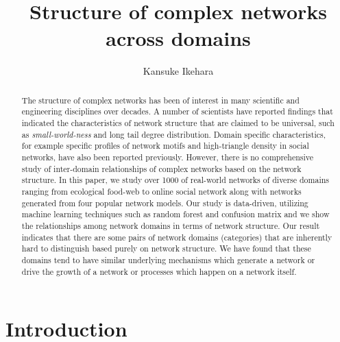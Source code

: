 \documentclass{article}
\begin{document}
\title{Structure of complex networks across domains}
\author{Kansuke Ikehara}
\maketitle

\begin{abstract}
The structure of complex networks has been of interest in many scientific and engineering disciplines over decades. A number of scientists have reported findings that indicated the characteristics of network structure that are claimed to be universal, such as \textit{small-world-ness} and long tail degree distribution. Domain specific characteristics, for example specific profiles of network motifs and high-triangle density in social networks, have also been reported previously. However, there is no comprehensive study of inter-domain relationships of complex networks based on the network structure. In this paper, we study over 1000 of real-world networks of diverse domains ranging from ecological food-web to online social network along with networks generated from four popular network models. Our study is data-driven, utilizing machine learning techniques such as random forest and confusion matrix and we show the relationships among network domains in terms of network structure. Our result indicates that there are some pairs of network domains (categories) that are inherently hard to distinguish based purely on network structure. We have found that these domains tend to have similar underlying mechanisms which generate a network or drive the growth of a network or processes which happen on a network itself.
  
\end{abstract}
\tableofcontents


\section{Introduction}
\end{document}
